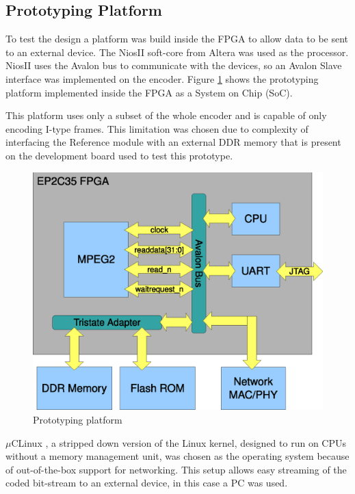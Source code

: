 \documentclass[a4paper, 12pt]{article}
\begin{document}
\subsection{Prototyping Platform}

To test the design a platform was build inside the FPGA to allow data to be sent to an external device. The NiosII soft-core from Altera was used as the processor. NiosII uses the Avalon \cite{avalon} bus to communicate with the devices, so an Avalon Slave interface was implemented on the encoder. Figure \ref{fig:platform} shows the prototyping platform implemented inside the FPGA as a System on Chip (SoC).

This platform uses only a subset of the whole encoder and is capable of only encoding I-type frames. This limitation was chosen due to complexity of interfacing the Reference module with an external DDR memory that is present on the development board used to test this prototype.

\begin{figure}[h]
\centering
\includegraphics[width=13cm]{figs/platform.eps}
\caption{Prototyping platform}
\label{fig:platform}
\end{figure}

$\mu$CLinux \cite{uclinux}, a stripped down version of the Linux kernel, designed to run on CPUs without a memory management unit, was chosen as the operating system because of out-of-the-box support for networking. This setup allows easy streaming of the coded bit-stream to an external device, in this case a PC was used.
\end{document}
